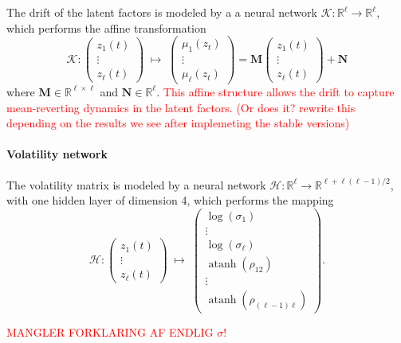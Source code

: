 The drift of the latent factors is modeled by a a neural network $\mathcal{K}:\mathbb{R}^\ell\rightarrow\mathbb{R}^\ell$, which performs the affine transformation
\[
\mathcal{K} :
\begin{pmatrix}
z_1(t) \\
\vdots \\
z_\ell(t)
\end{pmatrix}
\;\mapsto\;
\begin{pmatrix}
\mu_1(z_t) \\
\vdots \\
\mu_\ell(z_t)
\end{pmatrix}
=
\mathbf{M}
\begin{pmatrix}
z_1(t) \\
\vdots \\
z_\ell(t)
\end{pmatrix}
+
\mathbf{N}
\]
where $\mathbf{M}\in\mathbb{R}^{\ell\times \ell}$ and $\mathbf{N}\in\mathbb{R}^\ell$. \textcolor{red}{This affine structure allows the drift to capture mean-reverting dynamics in the latent factors. (Or does it? rewrite this depending on the results we see after implemeting the stable versions)}


\paragraph{Volatility network}
The volatility matrix is modeled by a neural network 
$\mathcal{H}:\mathbb{R}^{\ell}\rightarrow\mathbb{R}^{\ell+\ell(\ell-1)/2}$, with one hidden layer of dimension 4, which performs the mapping
\[
\mathcal{H} :
\begin{pmatrix}
z_1(t) \\
\vdots \\
z_\ell(t)
\end{pmatrix}
\;\mapsto\;
\begin{pmatrix}
\log(\sigma_1) \\
\vdots \\
\log(\sigma_\ell) \\
\operatorname{atanh}(\rho_{12}) \\
\vdots \\
\operatorname{atanh}(\rho_{(\ell-1)\ell})
\end{pmatrix}.
\]

\textcolor{red}{MANGLER FORKLARING AF ENDLIG $\sigma$!}





